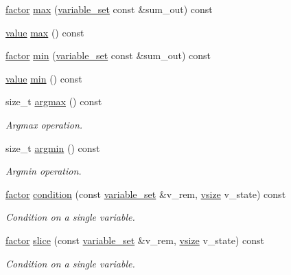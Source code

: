 \begin{DoxyCompactItemize}
\hyperlink{classmerlin_1_1factor}{factor} \hyperlink{classmerlin_1_1factor_a6721ab3b9160111105f2090c2bcb0f85}{max} (\hyperlink{classmerlin_1_1variable__set}{variable\+\_\+set} const \&sum\+\_\+out) const 
\item 
\hyperlink{classmerlin_1_1factor_a1b14d19e509403448fbef26b003c9281}{value} \hyperlink{classmerlin_1_1factor_a85cc2fae3b98293cfa5121b5c37557ab}{max} () const 
\item 
\hyperlink{classmerlin_1_1factor}{factor} \hyperlink{classmerlin_1_1factor_ab88837b62553278c4c1a37e20adc1894}{min} (\hyperlink{classmerlin_1_1variable__set}{variable\+\_\+set} const \&sum\+\_\+out) const 
\item 
\hyperlink{classmerlin_1_1factor_a1b14d19e509403448fbef26b003c9281}{value} \hyperlink{classmerlin_1_1factor_a26c250004bfcb697a5395d2acc73105b}{min} () const 
\item 
size\+\_\+t \hyperlink{classmerlin_1_1factor_aeaf28cdd6920e429067d8d8e2f138eb3}{argmax} () const 
\begin{DoxyCompactList}\small\item\em Argmax operation. \end{DoxyCompactList}\item 
size\+\_\+t \hyperlink{classmerlin_1_1factor_aaa8231f511322628d028e359bb1f289e}{argmin} () const 
\begin{DoxyCompactList}\small\item\em Argmin operation. \end{DoxyCompactList}\item 
\hyperlink{classmerlin_1_1factor}{factor} \hyperlink{classmerlin_1_1factor_a8ca587935c5fa06988dfae2a07814bcf}{condition} (const \hyperlink{classmerlin_1_1variable__set}{variable\+\_\+set} \&v\+\_\+rem, \hyperlink{classmerlin_1_1factor_a31de8d8d0c43cc33dc3874408e75b0fc}{vsize} v\+\_\+state) const 
\begin{DoxyCompactList}\small\item\em Condition on a single variable. \end{DoxyCompactList}\item 
\hyperlink{classmerlin_1_1factor}{factor} \hyperlink{classmerlin_1_1factor_a30453f6fed71699fa163751ec3b70733}{slice} (const \hyperlink{classmerlin_1_1variable__set}{variable\+\_\+set} \&v\+\_\+rem, \hyperlink{classmerlin_1_1factor_a31de8d8d0c43cc33dc3874408e75b0fc}{vsize} v\+\_\+state) const 
\begin{DoxyCompactList}\small\item\em Condition on a single variable. \end{DoxyCompactList}\item 

\end{DoxyCompactItemize}
